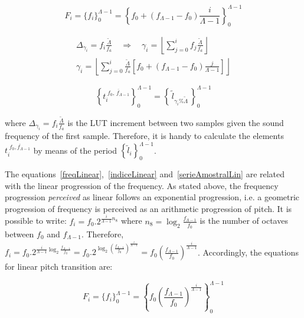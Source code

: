 \documentclass[
 aip,
 jmp,
 amsmath,amssymb,
 reprint,
]{revtex4-1}
\begin{document}
\begin{equation}\label{freqLinear}
 F_i=\{f_i\}_0^{\Lambda-1}=\left\{f_0 + (f_{\Lambda-1}-f_0)\frac{i}{\Lambda-1} \right\}_0^{\Lambda-1}
\end{equation}

\begin{equation}\label{indiceLinear}
\begin{split}
 \Delta_{\gamma_i}=f_i\frac{\widetilde{\Lambda}}{f_a} \quad \Rightarrow \quad \gamma_i= \left \lfloor \sum_{j=0}^{i} f_j\frac{\widetilde{\Lambda}}{f_a} \right \rfloor \\
\gamma_i=  \left \lfloor \sum_{j=0}^{i} \frac{\widetilde{\Lambda}}{f_a} \left [f_0 + (f_{\Lambda-1}-f_0)\frac{j}{\Lambda-1} \right ] \right \rfloor 
\end{split}
\end{equation}

\begin{equation}\label{serieAmostralLin}
 \left\{t_i^{\;\overline{f_0,\, f_{\Lambda-1}}}\right\}_0^{\Lambda-1}=\left\{\,\widetilde{l}_{\gamma_i \% \widetilde{\Lambda}}\,\right\}_0^{\Lambda-1}
\end{equation}

where $\Delta_{\gamma_i}=f_i\frac{\widetilde{\Lambda}}{f_a}$ is the LUT increment between two samples given the sound frequency of the first sample.
Therefore, it is handy to calculate the elements $t_i^{\;\overline{f_0,f_{\Lambda-1}}}$ by means of the period $\left\{\widetilde{l}_i\right\}_0^{\Lambda-1}$.

The equations~\ref{freqLinear},~\ref{indiceLinear} and~\ref{serieAmostralLin} are related with the linear progression of the frequency. As stated above, the frequency progression \emph{perceived} as linear follows an exponential progression, i.e. a geometric progression of frequency is perceived as an arithmetic progression of pitch.
It is possible to write: $f_i=f_0 . 2^{\frac{i}{\Lambda-1} n_8}$ where  $n_8=\log_2\frac{f_{\Lambda-1}}{f_0}$ is the number of octaves between $f_0$ and $f_{\Lambda-1}$.
Therefore, $f_i=f_0 . 2^{\frac{i}{\Lambda-1}\log_2\frac{f_{\Lambda-1}}{f_0}}=
 f_0 . 2^{\log_2\left ( \frac{f_{\Lambda-1}}{f_0} \right )^{\frac{i}{\Lambda-1}}}=
 f_0 \left ( \frac{f_{\Lambda-1}}{f_0} \right ) ^{\frac{i}{\Lambda -1}}$. Accordingly, the equations for linear pitch transition are:

\begin{equation}\label{freqExponencial}
 F_i=\{f_i\}_0^{\Lambda-1}=  \left\{f_0 \left ( \frac{f_{\Lambda-1}}{f_0} \right ) ^{\frac{i}{\Lambda -1}} \right\}_0^{\Lambda-1}
\end{equation}
\end{document}
